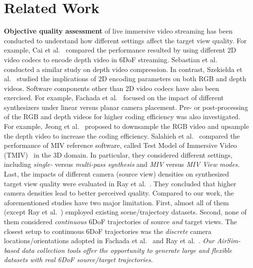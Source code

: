 \section{Related Work} \label{sec:related}

{\bf Objective quality assessment} of live immersive video streaming has been
conducted to understand how different settings affect the target view quality.
For example, Cai et al.~\cite{CWQP+21} compared the performance resulted by
using different 2D video codecs to encode depth video in 6DoF streaming. 
Sebastian et al.~\cite{SH17} conducted a similar
study on depth video compression.  In contrast, Szekielda et al.~\cite{SDM21}
studied the implications of 2D encoding parameters on both RGB and depth
videos. Software components other than 2D video codecs have also been
exercised. For example, Fachada et al.~\cite{FBSL18} focused on the impact of
different synthesizers under linear versus planar camera placement.  Pre- or
post-processing of the RGB and depth videos for higher coding efficiency was
also investigated. For example, Jeong et al.~\cite{JLRL+20} proposed to
downsample the RGB video and upsample the depth video to increase the coding
efficiency.  Salahieh et al.~\cite{SBB19} compared the performance of MIV
reference software, called Test Model of Immersive Video (TMIV)~\cite{tmiv_doc}
in the 3D domain. In particular, they considered different settings, including
{\em single-} versus {\em multi-pass synthesis} and {\em MIV} versus {\em MIV
View modes}. 
Last, the impacts of
different camera (source view) densities on synthesized target view quality
were evaluated in Ray et al.~\cite{RJL18}. They concluded that higher camera
densities lead to better perceived quality. Compared to our work, the
aforementioned studies have two major limitation. First, almost all of them (except Ray et al.~\cite{RJL18})
employed existing scene/trajectory datasets. 
Second, none of them considered  {\em continuous} 6DoF trajectories of
source {\em and} target views. The closest setup to continuous 6DoF
trajectories was the {\em discrete} camera locations/orientations adopted in Fachada
et al.~\cite{FBSL18} and Ray et al.~\cite{RJL18}. {\em Our AirSim-based data
collection tools offer the opportunity to generate large and flexible datasets
with real 6DoF source/target trajectories.}

